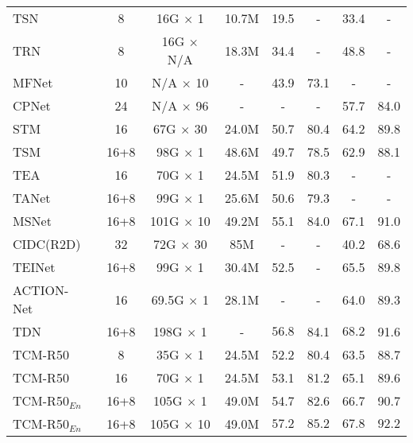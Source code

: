 \documentclass[journal]{IEEEtran}
\begin{document}
\begin{table*}
\begin{tabular}{l|c|c|c|c|c|c|c}
\hline
TSN~\cite{wang2016temporal}   & 8     & 16G $\times$ 1            & 10.7M & 19.5           & -              & 33.4           & -              \\
TRN~\cite{zhou2018temporal}  & 8     & 16G $\times$ N/A          & 18.3M & 34.4           & -              & 48.8           & -              \\
MFNet~\cite{lee2018motion}   & 10    & N/A $\times$ 10           & -     & 43.9           & 73.1           & -              & -              \\
CPNet~\cite{liu2019learning}   & 24    & N/A $\times$ 96           & -     & -              & -              & 57.7           & 84.0           \\
STM~\cite{jiang2019stm}       & 16    & 67G $\times$ 30  & 24.0M & 50.7           & 80.4           & 64.2           & 89.8 \\
TSM~\cite{lin2019tsm}       & 16+8  & 98G $\times$ 1   & 48.6M & 49.7           & 78.5           & 62.9           & 88.1           \\
TEA~\cite{li2020tea}     & 16       &  70G  $\times$ 1                        & 24.5M      & 51.9       &  80.3        & -          &  -              \\
TANet~\cite{liu2020tam} &16+8  & 99G $\times$ 1   & 25.6M & 50.6           & 79.3           & -           & -           \\
MSNet~\cite{kwon2020motionsqueeze}      & 16+8  & 101G $\times$ 10 & 49.2M & 55.1           & 84.0           & 67.1           & 91.0           \\
CIDC(R2D) ~\cite{li2020directional}  & 32    & 72G $\times$ 30   & 85M     & -           & -           & 40.2              & 68.6              \\
TEINet~\cite{liu2020teinet} &16+8  & 99G $\times$ 1   & 30.4M & 52.5           & -           & 65.5           & 89.8           \\
ACTION-Net~\cite{wang2021action} & 16  & 69.5G $\times$ 1            & 28.1M       & -        & - & 64.0   & 89.3 \\
TDN~\cite{wang2021tdn} & 16+8  & 198G $\times$ 1 & - & $56.8$           & 84.1           & $\mathbf{68.2}$           & 91.6           \\
\hline
TCM-R50          & 8      &     35G $\times$ 1                 &   24.5M    & 52.2      & 80.4        & 63.5           & 88.7                \\
TCM-R50          & 16     &     70G $\times$ 1          &   24.5M    & 53.1                & 81.2               &   65.1            & 89.6               \\
TCM-R50$_{En}$     & 16+8     &    105G $\times$ 1          &   49.0M    & 54.7                & 82.6                & 66.7       &  90.7              \\
TCM-R50$_{En}$     & 16+8     &    105G $\times$ 10          &   49.0M    & $\mathbf{57.2}$       & $\mathbf{85.2}$     &  $\mathbf{67.8}$    & $\mathbf{92.2}$ \\ \hline
\end{tabular}
\end{table*}
\end{document}
